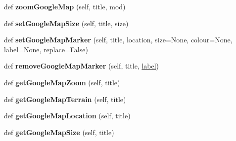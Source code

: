 \begin{DoxyCompactItemize}
\mbox{\label{class_python_01_g_u_i_1_1appjar_1_1gui_afb2a93824b9e2928709a54da190035de}} 
def {\bfseries zoom\+Google\+Map} (self, title, mod)
\item 
\mbox{\label{class_python_01_g_u_i_1_1appjar_1_1gui_af2b8a8bfc1fbde5c0067a61c414c401b}} 
def {\bfseries set\+Google\+Map\+Size} (self, title, size)
\item 
\mbox{\label{class_python_01_g_u_i_1_1appjar_1_1gui_a65b5d4993f92c5df6688d65caa87d332}} 
def {\bfseries set\+Google\+Map\+Marker} (self, title, location, size=None, colour=None, \hyperlink{class_python_01_g_u_i_1_1appjar_1_1gui_a899e593dca96dd2a31035558b685e3bd}{label}=None, replace=False)
\item 
\mbox{\label{class_python_01_g_u_i_1_1appjar_1_1gui_ae42bb9579ca29228d68df9635031d2f3}} 
def {\bfseries remove\+Google\+Map\+Marker} (self, title, \hyperlink{class_python_01_g_u_i_1_1appjar_1_1gui_a899e593dca96dd2a31035558b685e3bd}{label})
\item 
\mbox{\label{class_python_01_g_u_i_1_1appjar_1_1gui_a45770f0201b0420340179c4f040f615b}} 
def {\bfseries get\+Google\+Map\+Zoom} (self, title)
\item 
\mbox{\label{class_python_01_g_u_i_1_1appjar_1_1gui_a657fa7ff9e0d08bec99eb7919d4c6dc2}} 
def {\bfseries get\+Google\+Map\+Terrain} (self, title)
\item 
\mbox{\label{class_python_01_g_u_i_1_1appjar_1_1gui_a016f0face3b99e758b31ffaad347384c}} 
def {\bfseries get\+Google\+Map\+Location} (self, title)
\item 
\mbox{\label{class_python_01_g_u_i_1_1appjar_1_1gui_ad2e05cf5b5113d104c3db78f098f7288}} 
def {\bfseries get\+Google\+Map\+Size} (self, title)
\item 
\mbox{\label{class_python_01_g_u_i_1_1appjar_1_1gui_a51225ecb0055637f1f291e92d4ec7138}} 

\end{DoxyCompactItemize}
